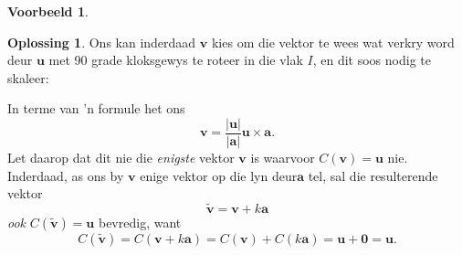 \documentclass[a4paper,11pt]{book}
\theoremstyle{definition}
\newtheorem{example_environment}{Voorbeeld}[chapter]
\newtheorem*{solution}{Oplossing}
\newcommand{\ve}[1]{\mathbf{#1}}
\newenvironment{example}
	{
		\begin{oframed}
		\begin{example_environment}
	}
	{
		\end{example_environment}
		\end{oframed}
	}
\begin{document}
\begin{example}
\begin{solution}
		Ons kan inderdaad $\ve{v}$ kies om die vektor te wees wat verkry
		word deur $\ve{u}$ met 90 grade kloksgewys te roteer in die vlak
		$I$, en dit soos nodig te skaleer:
	\begin{center}
	\end{center}
		In terme van 'n formule het ons
		\[
			\ve{v} = \frac{|\ve{u}|}{|\ve{a}|} \ve{u} \times \ve{a} .
		\]
		Let daarop dat dit nie die \emph{enigste} vektor $\ve{v}$ is
		waarvoor $C(\ve{v}) = \ve{u}$ nie. Inderdaad, as ons by $\ve{v}$
		enige vektor op die lyn deur$\ve{a}$ tel, sal die resulterende
		vektor
		\[
			\tilde{\ve{v}} = \ve{v} + k \ve{a}
		\]
		\emph{ook} $C(\tilde{\ve{v}}) = \ve{u}$ bevredig, want
		\[
			C(\tilde{\ve{v}}) = C(\ve{v} + k \ve{a}) = C(\ve{v}) + C(k
			\ve{a}) = \ve{u} + \ve{0} = \ve{u}.
		\]
	\end{solution}
\end{example}
\end{document}

